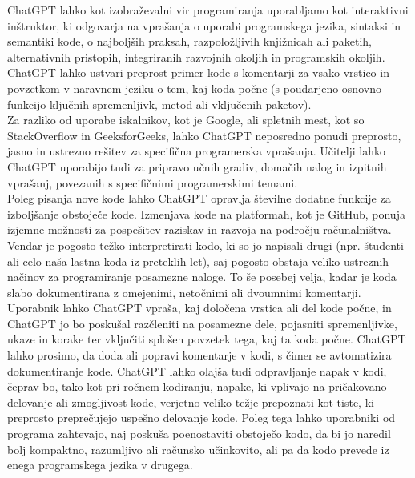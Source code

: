 \documentclass[a4paper,12pt,openright]{book}
\begin{document}
ChatGPT lahko kot izobraževalni vir programiranja uporabljamo kot interaktivni inštruktor, ki odgovarja na vprašanja o uporabi programskega jezika, sintaksi in semantiki kode, o najboljših praksah, razpoložljivih knjižnicah ali paketih, alternativnih pristopih, integriranih razvojnih okoljih in programskih okoljih. ChatGPT lahko ustvari preprost primer kode s komentarji za vsako vrstico in povzetkom v naravnem jeziku o tem, kaj koda počne (s poudarjeno osnovno funkcijo ključnih spremenljivk, metod ali vključenih paketov). \cite{openai_chatgpt} \\
Za razliko od uporabe iskalnikov, kot je Google, ali spletnih mest, kot so StackOverflow in GeeksforGeeks, lahko ChatGPT neposredno ponudi preprosto, jasno in ustrezno rešitev za specifična programerska vprašanja. Učitelji lahko ChatGPT uporabijo tudi za pripravo učnih gradiv, domačih nalog in izpitnih vprašanj, povezanih s specifičnimi programerskimi temami. \cite{Meyer2023} \\
Poleg pisanja nove kode lahko ChatGPT opravlja številne dodatne funkcije za izboljšanje obstoječe kode. Izmenjava kode na platformah, kot je GitHub, ponuja izjemne možnosti za pospešitev raziskav in razvoja na področju računalništva. Vendar je pogosto težko interpretirati kodo, ki so jo napisali drugi (npr. študenti ali celo naša lastna koda iz preteklih let), saj pogosto obstaja veliko ustreznih načinov za programiranje posamezne naloge. To še posebej velja, kadar je koda slabo dokumentirana z omejenimi, netočnimi ali dvoumnimi komentarji. Uporabnik lahko ChatGPT vpraša, kaj določena vrstica ali del kode počne, in ChatGPT jo bo poskušal razčleniti na posamezne dele, pojasniti spremenljivke, ukaze in korake ter vključiti splošen povzetek tega, kaj ta koda počne. ChatGPT lahko prosimo, da doda ali popravi komentarje v kodi, s čimer se avtomatizira dokumentiranje kode. ChatGPT lahko olajša tudi odpravljanje napak v kodi, čeprav bo, tako kot pri ročnem kodiranju, napake, ki vplivajo na pričakovano delovanje ali zmogljivost kode, verjetno veliko težje prepoznati kot tiste, ki preprosto preprečujejo uspešno delovanje kode. Poleg tega lahko uporabniki od programa zahtevajo, naj poskuša poenostaviti obstoječo kodo, da bi jo naredil bolj kompaktno, razumljivo ali računsko učinkovito, ali pa da kodo prevede iz enega programskega jezika v drugega. \cite{Meyer2023}
\end{document}

